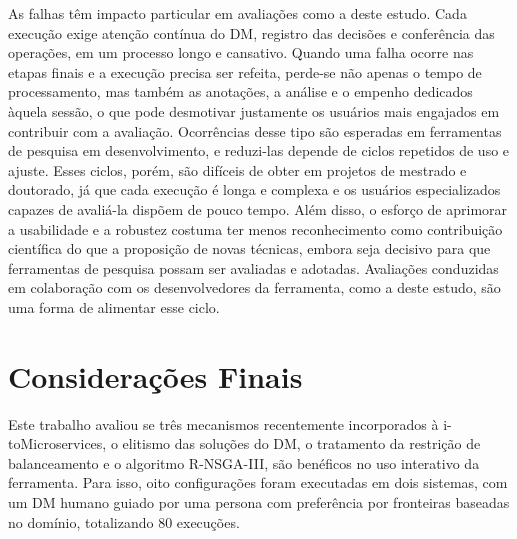 \documentclass[conference]{IEEEtran}
\newcommand{\itm}{\mbox{i-toMicroservices}}
\begin{document}
As falhas têm impacto particular em avaliações como a deste estudo. Cada execução exige atenção contínua do DM, registro das decisões e conferência das operações, em um processo longo e cansativo. Quando uma falha ocorre nas etapas finais e a execução precisa ser refeita, perde-se não apenas o tempo de processamento, mas também as anotações, a análise e o empenho dedicados àquela sessão, o que pode desmotivar justamente os usuários mais engajados em contribuir com a avaliação. Ocorrências desse tipo são esperadas em ferramentas de pesquisa em desenvolvimento, e reduzi-las depende de ciclos repetidos de uso e ajuste. Esses ciclos, porém, são difíceis de obter em projetos de mestrado e doutorado, já que cada execução é longa e complexa e os usuários especializados capazes de avaliá-la dispõem de pouco tempo. Além disso, o esforço de aprimorar a usabilidade e a robustez costuma ter menos reconhecimento como contribuição científica do que a proposição de novas técnicas, embora seja decisivo para que ferramentas de pesquisa possam ser avaliadas e adotadas. Avaliações conduzidas em colaboração com os desenvolvedores da ferramenta, como a deste estudo, são uma forma de alimentar esse ciclo.

\section{Considerações Finais}\label{sec:conclusao}

Este trabalho avaliou se três mecanismos recentemente incorporados à \itm{}, o elitismo das soluções do DM, o tratamento da restrição de balanceamento e o algoritmo R-NSGA-III, são benéficos no uso interativo da ferramenta. Para isso, oito configurações foram executadas em dois sistemas, com um DM humano guiado por uma persona com preferência por fronteiras baseadas no domínio, totalizando 80 execuções.
\end{document}
